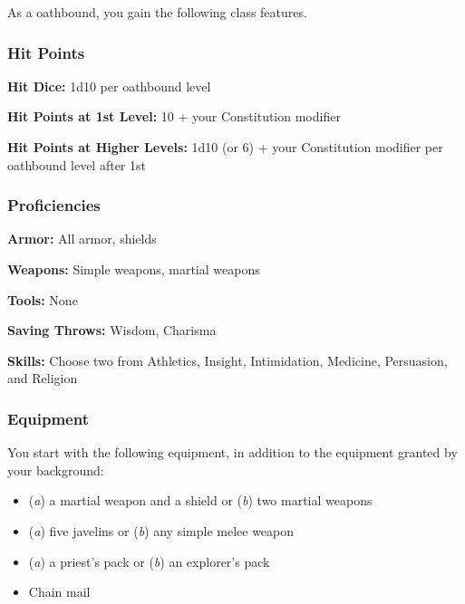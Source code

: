 As a oathbound, you gain the following class features.

\subsubsection{Hit Points}

\textbf{Hit Dice:} 1d10 per oathbound level

\textbf{Hit Points at 1st Level:} 10 + your Constitution modifier

\textbf{Hit Points at Higher Levels:} 1d10 (or 6) + your Constitution modifier per oathbound level after 1st

\subsubsection{Proficiencies}

\textbf{Armor:} All armor, shields

\textbf{Weapons:} Simple weapons, martial weapons

\textbf{Tools:} None

\textbf{Saving Throws:} Wisdom, Charisma

\textbf{Skills:} Choose two from Athletics, Insight, Intimidation, Medicine, Persuasion, and Religion

\subsubsection{Equipment}

You start with the following equipment, in addition to the equipment granted by your background:
\begin{itemize}
\item (\textit{a}) a martial weapon and a shield or (\textit{b}) two martial weapons
\item (\textit{a}) five javelins or (\textit{b}) any simple melee weapon
\item (\textit{a}) a priest's pack or (\textit{b}) an explorer's pack
\item Chain mail
\end{itemize}

